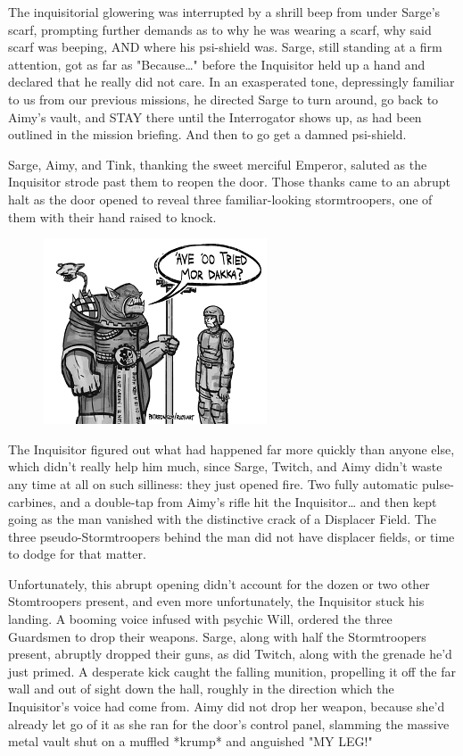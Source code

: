 The inquisitorial glowering was interrupted by a shrill beep from under Sarge's scarf, prompting further demands as to why he was wearing a scarf, why said scarf was beeping, AND where his psi-shield was. 
Sarge, still standing at a firm attention, got as far as "Because…" before the Inquisitor held up a hand and declared that he really did not care. 
In an exasperated tone, depressingly familiar to us from our previous missions, he directed Sarge to turn around, go back to Aimy's vault, and STAY there until the Interrogator shows up, as had been outlined in the mission briefing. 
And then to go get a damned psi-shield.

Sarge, Aimy, and Tink, thanking the sweet merciful Emperor, saluted as the Inquisitor strode past them to reopen the door. 
Those thanks came to an abrupt halt as the door opened to reveal three familiar-looking stormtroopers, one of them with their hand raised to knock. 


\begin{figure}
	\begin{center}
		\includegraphics[width=\figwidth]{pics/21/86.png}
	\end{center}
\end{figure}
The Inquisitor figured out what had happened far more quickly than anyone else, which didn't really help him much, since Sarge, Twitch, and Aimy didn't waste any time at all on such silliness: 
they just opened fire. 
Two fully automatic pulse-carbines, and a double-tap from Aimy's rifle hit the Inquisitor… and then kept going as the man vanished with the distinctive crack of a Displacer Field. 
The three pseudo-Stormtroopers behind the man did not have displacer fields, or time to dodge for that matter.

Unfortunately, this abrupt opening didn't account for the dozen or two other Stomtroopers present, and even more unfortunately, the Inquisitor stuck his landing. 
A booming voice infused with psychic Will, ordered the three Guardsmen to drop their weapons. 
Sarge, along with half the Stormtroopers present, abruptly dropped their guns, as did Twitch, along with the grenade he'd just primed. 
A desperate kick caught the falling munition, propelling it off the far wall and out of sight down the hall, roughly in the direction which the Inquisitor's voice had come from. 
Aimy did not drop her weapon, because she'd already let go of it as she ran for the door's control panel, slamming the massive metal vault shut on a muffled *krump* and anguished "MY LEG!"

